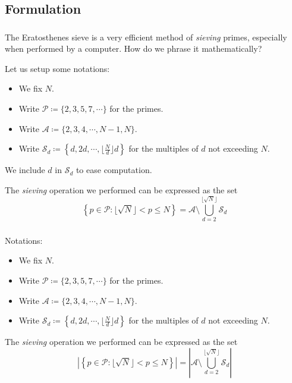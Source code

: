 
\subsection{Formulation}
\begin{frame}\frametitle{\insertsubsection}
The Eratosthenes sieve is a very efficient method of \textit{sieving} primes, especially when performed by a computer. How do we phrase it mathematically?
\pause

Let us setup some notations:
\begin{itemize}
  \item We fix \(N\).
  \item Write \(\mathcal{P} \coloneqq \{2, 3, 5, 7, \cdots\}\) for the primes.
  \item Write \(\mathcal{A} \coloneqq \{2, 3, 4, \cdots, N - 1, N\}\).
  \item Write \(\mathcal{S}_d \coloneqq \left\{d, 2d, \cdots, \lfloor\frac{N}{d}\rfloor d\right\}\) for the multiples of \(d\) not exceeding \(N\).
\end{itemize}

We include \(d\) in \(\mathcal{S}_d\) to ease computation.
\pause

The \textit{sieving} operation we performed can be expressed as the set
\[
  \left\{ p \in \mathcal{P} : \lfloor\sqrt{N}\rfloor < p \leq N \right\}
    = \mathcal{A} \setminus \bigcup_{d = 2}^{\lfloor\sqrt{N}\rfloor} \mathcal{S}_d
\]
\end{frame}

\begin{frame}\frametitle{\insertsubsection}
Notations:
\begin{itemize}
  \item We fix \(N\).
  \item Write \(\mathcal{P} \coloneqq \{2, 3, 5, 7, \cdots\}\) for the primes.
  \item Write \(\mathcal{A} \coloneqq \{2, 3, 4, \cdots, N - 1, N\}\).
  \item Write \(\mathcal{S}_d \coloneqq \left\{d, 2d, \cdots, \lfloor\frac{N}{d}\rfloor d\right\}\) for the multiples of \(d\) not exceeding \(N\).
\end{itemize}

The \textit{sieving} operation we performed can be expressed as the set
\[
  \left|\left\{ p \in \mathcal{P} : \lfloor\sqrt{N}\rfloor < p \leq N \right\}\right|
    = \left|\mathcal{A} \setminus \bigcup_{d = 2}^{\lfloor\sqrt{N}\rfloor} \mathcal{S}_d\right|
\]
\end{frame}

